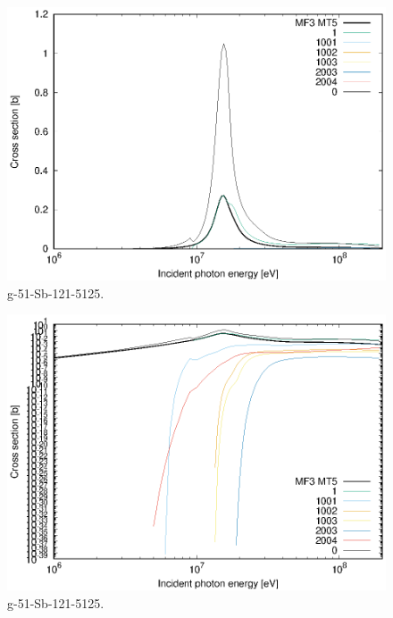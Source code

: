 \begin{figure}
 \includegraphics[width=\linewidth]{eps/g_51-Sb-121_5125.eps}
  \caption{g-51-Sb-121-5125.}
\end{figure}
\begin{figure}
 \includegraphics[width=\linewidth]{eps-log/g_51-Sb-121_5125.eps}
 \caption{g-51-Sb-121-5125.}
\end{figure}
\newpage \clearpage

